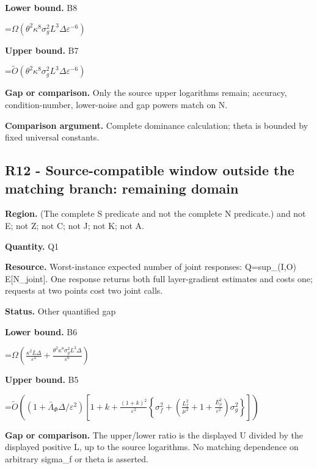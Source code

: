 \documentclass[10pt,a4paper]{article}
\newcommand{\AtlasMath}[1]{\par\begingroup\centering\setbox0=\hbox{$\displaystyle #1$}\ifdim\wd0>1.4\linewidth\typeout{ATLAS WIDE FORMULA: \the\wd0}\fi\ifdim\wd0>\linewidth\resizebox{\linewidth}{!}{\box0}\else\box0\fi\par\endgroup}
\begin{document}
\textbf{Lower bound.} B8



\AtlasMath{\Omega(\theta^2\kappa^8\sigma_g^2L^3\Delta\varepsilon^{-6})}


\textbf{Upper bound.} B7



\AtlasMath{\widetilde O(\theta^2\kappa^8\sigma_g^2L^3\Delta\varepsilon^{-6})}


\textbf{Gap or comparison.} Only the source upper logarithms remain; accuracy, condition-number, lower-noise and gap powers match on N.



\textbf{Comparison argument.} Complete dominance calculation; theta is bounded by fixed universal constants.



\subsection{R12 - Source-compatible window outside the matching branch: remaining domain}


\textbf{Region.} (The complete S predicate and not the complete N predicate.) and not E; not Z; not C; not J; not K; not A.



\textbf{Quantity.} Q1



\textbf{Resource.} Worst-instance expected number of joint responses: Q=sup\_(I,O) E[N\_joint]. One response returns both full layer-gradient estimates and costs one; requests at two points cost two joint calls.



\textbf{Status.} Other quantified gap



\textbf{Lower bound.} B6



\AtlasMath{\Omega\!\left(\frac{\kappa^2L\Delta}{\varepsilon^2}+\frac{\theta^2\kappa^8\sigma_g^2L^3\Delta}{\varepsilon^6}\right)}


\textbf{Upper bound.} B5



\AtlasMath{\widetilde O\!\left((1+\bar\Lambda_\Phi\Delta/\varepsilon^2)\left[1+k+\frac{(1+k)^2}{\varepsilon^2}\left\{\sigma_f^2+\left(\frac{L_f^2}{\mu^2}+1+\frac{E_\rho^2}{\varepsilon^2}\right)\sigma_g^2\right\}\right]\right)}


\textbf{Gap or comparison.} The upper/lower ratio is the displayed U divided by the displayed positive L, up to the source logarithms. No matching dependence on arbitrary sigma\_f or theta is asserted.
\end{document}
